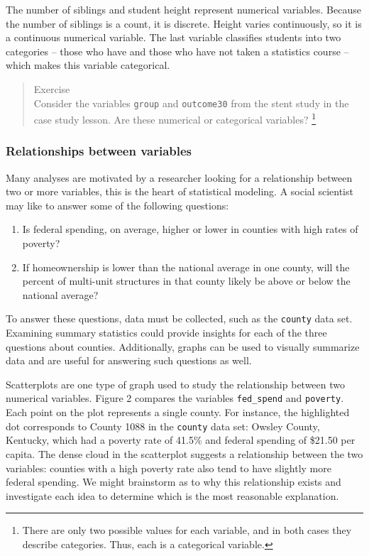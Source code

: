 \documentclass[
]{article}
\providecommand{\tightlist}{%
  \setlength{\itemsep}{0pt}\setlength{\parskip}{0pt}}
\begin{document}
The number of siblings and student height represent numerical variables.
Because the number of siblings is a count, it is discrete. Height varies
continuously, so it is a continuous numerical variable. The last
variable classifies students into two categories -- those who have and
those who have not taken a statistics course -- which makes this
variable categorical.

\begin{quote}
Exercise\\
Consider the variables \texttt{group} and \texttt{outcome30} from the
stent study in the case study lesson. Are these numerical or categorical
variables? \footnote{There are only two possible values for each
  variable, and in both cases they describe categories. Thus, each is a
  categorical variable.}
\end{quote}

\hypertarget{relationships-between-variables}{%
\subsubsection{Relationships between
variables}\label{relationships-between-variables}}

Many analyses are motivated by a researcher looking for a relationship
between two or more variables, this is the heart of statistical
modeling. A social scientist may like to answer some of the following
questions:

\begin{enumerate}
\def\labelenumi{\arabic{enumi}.}
\tightlist
\item
  Is federal spending, on average, higher or lower in counties with high
  rates of poverty?\\
\item
  If homeownership is lower than the national average in one county,
  will the percent of multi-unit structures in that county likely be
  above or below the national average?
\end{enumerate}

To answer these questions, data must be collected, such as the
\texttt{county} data set. Examining summary statistics could provide
insights for each of the three questions about counties. Additionally,
graphs can be used to visually summarize data and are useful for
answering such questions as well.

Scatterplots are one type of graph used to study the relationship
between two numerical variables. Figure 2 compares the variables
\texttt{fed\_spend} and \texttt{poverty}. Each point on the plot
represents a single county. For instance, the highlighted dot
corresponds to County 1088 in the \texttt{county} data set: Owsley
County, Kentucky, which had a poverty rate of 41.5\% and federal
spending of \$21.50 per capita. The dense cloud in the scatterplot
suggests a relationship between the two variables: counties with a high
poverty rate also tend to have slightly more federal spending. We might
brainstorm as to why this relationship exists and investigate each idea
to determine which is the most reasonable explanation.
\end{document}
